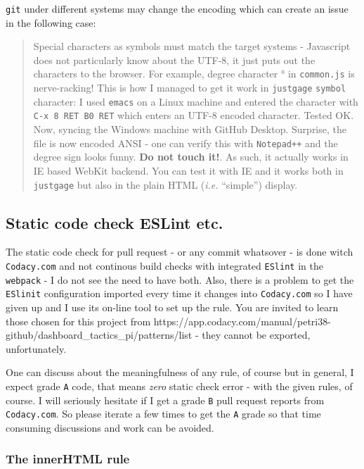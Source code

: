 \documentclass[11pt]{article}
\begin{document}
    \texttt{git} under different systems may change the encoding which can
create an issue in the following case:

    \begin{quote}
Special characters as symbols must match the target systems - Javascript
does not particularly know about the UTF-8, it just puts out the
characters to the browser. For example, degree character ° in
\texttt{common.js} is nerve-racking! This is how I managed to get it
work in \texttt{justgage} \texttt{symbol} character: I used
\texttt{emacs} on a Linux machine and entered the character with
\texttt{C-x\ 8\ RET\ B0\ RET} which enters an UTF-8 encoded character.
Tested OK. Now, syncing the Windows machine with GitHub Desktop.
Surprise, the file is now encoded ANSI - one can verify this with
\texttt{Notepad++} and the degree sign looks funny. \textbf{Do not touch
it!}. As such, it actually works in IE based WebKit backend. You can
test it with IE and it works both in \texttt{justgage} but also in the
plain HTML (\emph{i.e.} ``simple'') display.
\end{quote}

    \hypertarget{static-code-check-eslint-etc.}{%
\subsection{Static code check ESLint
etc.}\label{static-code-check-eslint-etc.}}

    The static code check for pull request - or any commit whatsover - is
done witch \texttt{Codacy.com} and not continous build checks with
integrated \texttt{ESlint} in the \texttt{webpack} - I do not see the
need to have both. Also, there is a problem to get the \texttt{ESlinit}
configuration imported every time it changes into \texttt{Codacy.com} so
I have given up and I use its on-line tool to set up the rule. You are
invited to learn those chosen for this project from
https://app.codacy.com/manual/petri38-github/dashboard\_tactics\_pi/patterns/list
- they cannot be exported, unfortunately.

    One can discuss about the meaningfulness of any rule, of course but in
general, I expect grade \texttt{A} code, that means \emph{zero} static
check error - with the given rules, of course. I will seriously hesitate
if I get a grade \texttt{B} pull request reports from
\texttt{Codacy.com}. So please iterate a few times to get the \texttt{A}
grade so that time consuming discussions and work can be avoided.

    \hypertarget{the-innerhtml-rule}{%
\subsubsection{The innerHTML rule}\label{the-innerhtml-rule}}
\end{document}
